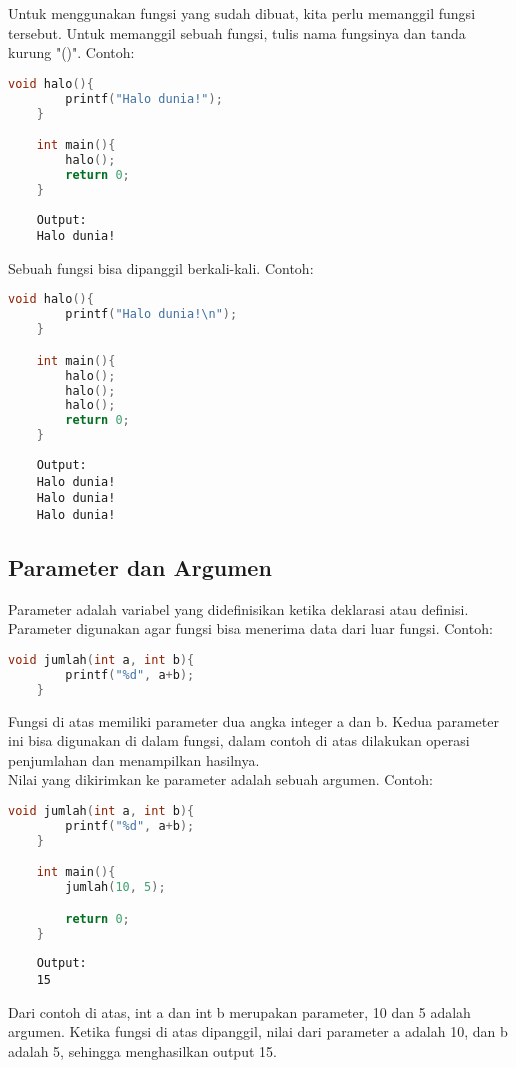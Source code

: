Untuk menggunakan fungsi yang sudah dibuat, kita perlu memanggil fungsi tersebut.
Untuk memanggil sebuah fungsi, tulis nama fungsinya dan tanda kurung "()".
Contoh:
\begin{lstlisting}[language=c]
	void halo(){
		printf("Halo dunia!");
	}

	int main(){
		halo();
		return 0;
	}
\end{lstlisting}
\begin{verbatim}
	Output:
	Halo dunia!
\end{verbatim}
Sebuah fungsi bisa dipanggil berkali-kali. Contoh:
\begin{lstlisting}[language=c]
	void halo(){
		printf("Halo dunia!\n");
	}

	int main(){
		halo();
		halo();
		halo();
		return 0;
	}
\end{lstlisting}
\begin{verbatim}
	Output:
	Halo dunia!
	Halo dunia!
	Halo dunia!
\end{verbatim}

\subsection{Parameter dan Argumen}

Parameter adalah variabel yang didefinisikan ketika deklarasi atau definisi.
Parameter digunakan agar fungsi bisa menerima data dari luar fungsi.
Contoh:
\begin{lstlisting}[language=c]
	void jumlah(int a, int b){
		printf("%d", a+b);
	}
\end{lstlisting}
Fungsi di atas memiliki parameter dua angka integer a dan b.
Kedua parameter ini bisa digunakan di dalam fungsi, dalam contoh di atas dilakukan operasi penjumlahan dan menampilkan hasilnya.
\\ Nilai yang dikirimkan ke parameter adalah sebuah argumen.
Contoh:
\begin{lstlisting}[language=c]
	void jumlah(int a, int b){
		printf("%d", a+b);
	}

	int main(){
		jumlah(10, 5);

		return 0;
	}
\end{lstlisting}
\begin{verbatim}
	Output:
	15
\end{verbatim}
Dari contoh di atas, int a dan int b merupakan parameter, 10 dan 5 adalah argumen.
Ketika fungsi di atas dipanggil, nilai dari parameter a adalah 10, dan b adalah 5, sehingga menghasilkan output 15.

